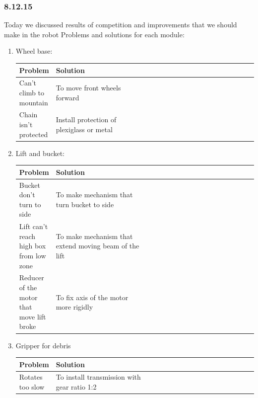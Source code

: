 \subsubsection{8.12.15}
Today we discussed results of competition and improvements that we should make in the robot\newline
Problems and solutions for each module:
\begin{enumerate}
	\item Wheel base:
	\begin{table}[H]
		\vspace{-2mm}
		\begin{center}
			\begin{tabular}{|p{0.15\linewidth}|p{0.4\linewidth}|p{0.55\linewidth}}
				\hline
				Problem & Solution\\
				\hline
				Can't climb to mountain  & To move front wheels forward   \\	
				\hline
				Chain isn't protected & Install protection of plexiglass or metal\\
				\hline
			\end{tabular}
		\end{center}
	\end{table}
	\item Lift and bucket:
	\begin{table}[H]
		\vspace{-2mm}
		\begin{center}
			\begin{tabular}{|p{0.15\linewidth}|p{0.4\linewidth}|p{0.55\linewidth}}
				\hline
				Problem & Solution\\
				\hline
				Bucket don't turn to side  & To make mechanism that turn bucket to side   \\	
				\hline
				Lift can't reach high box from low zone & To make mechanism that extend moving beam of the lift\\
				\hline
				Reducer of the motor that move lift broke & To fix axis of the motor more rigidly\\
				\hline
			\end{tabular}
		\end{center}
	\end{table}
	\item Gripper for debris
	\begin{table}[H]
		\vspace{-2mm}
		\begin{center}
			\begin{tabular}{|p{0.15\linewidth}|p{0.4\linewidth}|p{0.55\linewidth}}
				\hline
				Problem & Solution\\
				\hline
				Rotates too slow  & To install transmission with gear ratio 1:2   \\	
				\hline
			\end{tabular}
		\end{center}
	\end{table}
	

\end{enumerate}
